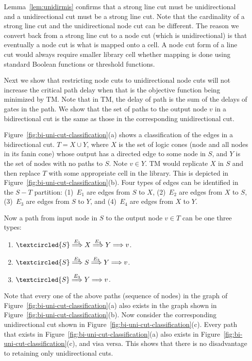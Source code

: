 \documentclass[journal]{IEEEtran}
\begin{document}
Lemma~\ref{lem:unidirmis} confirms that a strong line cut must be unidirectional and a unidirectional cut must be a strong line cut. 
Note that the cardinality of a strong line cut and the unidirectional node cut can be different. The reason we convert back from a strong line cut to a node cut (which is unidirectional) is that eventually a node cut is what is mapped onto a cell. A node cut form of a line cut would always require smaller library cell whether mapping is done using standard Boolean functions or threshold functions.

Next we show that restricting node cuts to unidirectional node cuts will not increase the critical path delay when that is the objective function being minimized by TM.  Note that in TM, the delay of  path is the sum of the delays of gates in the path. We show that the set of paths to the output node $v$  in a bidirectional cut is the same as those in the corresponding unidirectional cut. 

Figure~\ref{fig:bi-uni-cut-classification}(a) shows a classification of the edges in a bidirectional cut.  $T = X \cup Y$, where $X$ is the set of logic cones (node and all nodes in its fanin cone) whose output has a directed edge to some node in $S$, and $Y$ is the set of nodes with no paths to $S$.  Note $v \in Y$.  TM would replicate $X$ in $S$ and then replace $T$ with some appropriate cell in the library.  This is depicted in Figure~\ref{fig:bi-uni-cut-classification}(b).  Four types of edges can be identified in the $S-T$ partition: (1)~$E_1$ are edges from $S$ to $X$, (2)~$E_2$ are edges from $X$ to $S$, (3)~$E_3$ are edges from $S$ to $Y$, and (4)~$E_4$ are edges from $X$ to $Y$. 

Now a path from input node in $S$ to the output node $v \in T$ can be one three types: 
\begin{enumerate}
\item $\textcircled{S} \stackrel {E_1}{\Longrightarrow} X \stackrel {E_4}{\Longrightarrow} Y \Longrightarrow v$.
\item $\textcircled{S} \stackrel {E_2}{\Longrightarrow} S \stackrel {E_3}{\Longrightarrow} Y \Longrightarrow v$. 
\item $\textcircled{S} \stackrel {E_3}{\Longrightarrow} Y \Longrightarrow v$. 
\end{enumerate}
Note that every one of the above paths (sequence of nodes) in the graph of Figure~\ref{fig:bi-uni-cut-classification}(a) also exists in the graph shown in Figure~\ref{fig:bi-uni-cut-classification}(b). Now consider the corresponding unidirectional cut shown in Figure~\ref{fig:bi-uni-cut-classification}(c). Every path that exists in Figure~\ref{fig:bi-uni-cut-classification}(a) also exists in Figure~\ref{fig:bi-uni-cut-classification}(c), and visa versa. This shows that there is no disadvantage to retaining only unidirectional cuts. 
\end{document}
